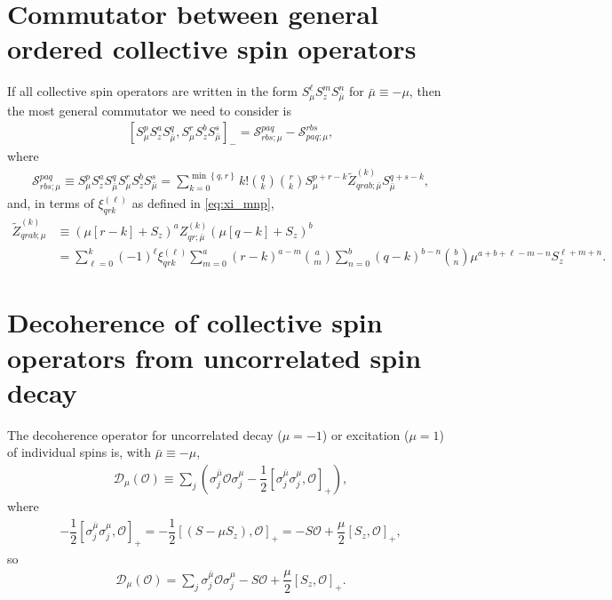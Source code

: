 \documentclass[aps,notitlepage,nofootinbib,11pt]{revtex4-1}
\newcommand{\f}[2]{\dfrac{#1}{#2}} %
\newcommand{\p}[1]{\left(#1\right)} %
\renewcommand{\sp}[1]{\left[#1\right]} %
\renewcommand{\set}[1]{\left\{#1\right\}} %
\newcommand{\D}{\mathcal{D}}
\renewcommand{\O}{\mathcal{O}}
\renewcommand{\S}{\mathcal{S}}
\newcommand{\bmu}{{\bar\mu}}
\newcommand{\1}{\mathds{1}}
\begin{document}
\section{Commutator between general ordered collective spin operators}
\label{sec:comm_general}

If all collective spin operators are written in the form
$S_\mu^\ell S_z^m S_\bmu^n$ for $\bmu\equiv-\mu$, then the most
general commutator we need to consider is
\begin{align}
  \sp{S_\mu^p S_z^a S_\bmu^q, S_\mu^r S_z^b S_\bmu^s}_-
  = \S^{paq}_{rbs;\mu} - \S^{rbs}_{paq;\mu},
\end{align}
where
\begin{align}
  \S^{paq}_{rbs;\mu}
  \equiv S_\mu^p S_z^a S_\bmu^q S_\mu^r S_z^b S_\bmu^s
  = \sum_{k=0}^{\min\set{q,r}} k! { q \choose k } { r \choose k }
  S_\mu^{p+r-k} \tilde Z_{qrab;\bmu}^{(k)} S_\bmu^{q+s-k},
\end{align}
and, in terms of $\xi_{qrk}^{(\ell)}$ as defined in \eqref{eq:xi_mnp},
\begin{align}
  \tilde Z_{qrab;\mu}^{(k)}
  &\equiv \p{\mu\sp{r-k}+S_z}^a
  Z_{qr;\bmu}^{(k)} \p{\mu\sp{q-k}+S_z}^b \\
  &= \sum_{\ell=0}^k \p{-1}^\ell \xi_{qrk}^{(\ell)}
  \sum_{m=0}^a \p{r-k}^{a-m} { a \choose m }
  \sum_{n=0}^b \p{q-k}^{b-n} { b \choose n }
  \mu^{a+b+\ell-m-n} S_z^{\ell+m+n}.
\end{align}


\section{Decoherence of collective spin operators from uncorrelated
  spin decay}
\label{sec:decoherence}

The decoherence operator for uncorrelated decay ($\mu=-1$) or
excitation ($\mu=1$) of individual spins is, with $\bmu\equiv-\mu$,
\begin{align}
  \D_\mu\p{\O}
  \equiv \sum_j\p{\sigma_j^\bmu \O \sigma_j^\mu
    - \f12\sp{\sigma_j^\bmu \sigma_j^\mu,\O}_+},
\end{align}
where
\begin{align}
  -\f12 \sp{\sigma_j^\bmu \sigma_j^\mu,\O}_+
  = -\f12\sp{\p{S-\mu S_z}, \O}_+
  = -S\O + \f{\mu}{2} \sp{S_z, \O}_+,
\end{align}
so
\begin{align}
  \D_\mu\p{\O}
  = \sum_j\sigma_j^\bmu \O \sigma_j^\mu
    - S \O + \f{\mu}{2} \sp{S_z, \O}_+.
  \label{eq:D_mu}
\end{align}
\end{document}
